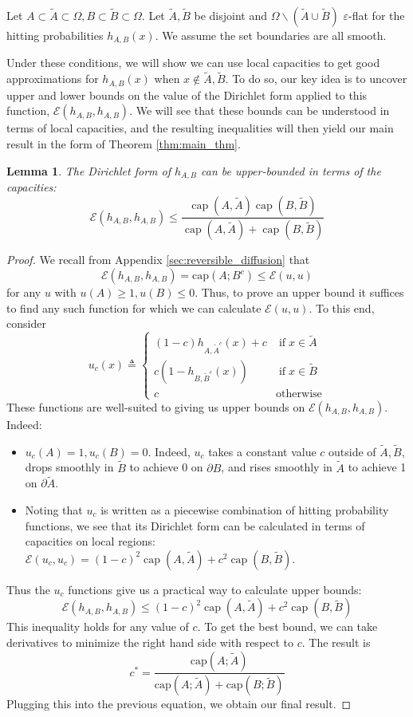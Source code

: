 \documentclass[english, aip, jcp, priprint, graphicx,floatfix]{revtex4-1}
\newcommand{\tmop}[1]{\ensuremath{\operatorname{#1}}}
\newtheorem{lemma}{Lemma}
\theoremstyle{plain}
\theoremstyle{definition}
\theoremstyle{plain}
\newcommand{\capac}[2]{\mathrm{cap}\left(#1;#2\right)}
\begin{document}
Let $A\subset\tilde A\subset\Omega,B\subset\tilde B\subset\Omega$.  Let $\tilde A,\tilde B$ be disjoint and $\Omega \backslash (\tilde A \cup \tilde B)$ $\varepsilon$-flat for the hitting probabilities $h_{A,B}(x)$.  We assume the set boundaries are all smooth.  

Under these conditions, we will show we can use local capacities to get good approximations for $h_{A,B}(x)$ when $x\notin \tilde A,\tilde B$.  To do so, our key idea is to uncover upper and lower bounds on the value of the Dirichlet form applied to this function, $\mathcal{E}(h_{A,B},h_{A,B})$.  We will see that these bounds can be understood in terms of local capacities, and the resulting inequalities will then yield our main result in the form of Theorem \ref{thm:main_thm}.

\begin{lemma}  The Dirichlet form of $h_{A,B}$ can be upper-bounded in terms of the capacities:
\[ \mathcal{E} (h_{A,B}, h_{A,B}) \leqslant \frac{\tmop{cap} (A, \tilde{A}) \tmop{cap} (B,
\tilde{B})}{\tmop{cap} (A, \tilde{A}) + \tmop{cap} (B, \tilde{B})} \]
\end{lemma}
\begin{proof}
We recall from Appendix \ref{sec:reversible_diffusion} that
%
\[
\mathcal{E} (h_{A,B}, h_{A,B}) = \capac{A}{B^c} \leq \mathcal{E} (u,u)
\]
%
for any $u$ with $u(A)\geq1,u(B)\leq0$.  Thus, to prove an upper bound it suffices to find any such function for which we can calculate $\mathcal{E}(u,u)$.  To this end, consider
%
\[
u_c (x) \triangleq \left\{ \begin{array}{ll}
(1 - c) h_{A, \widetilde{A}^c} (x) + c & \tmop{if} x \in \tilde{A}\\
c (1 - h_{B, \widetilde{B}^c} (x)) & \tmop{if} x \in \tilde{B}\\
c & \tmop{otherwise}
\end{array} \right. 
\]
%
These functions are well-suited to giving us upper bounds on $\mathcal{E} (h_{A,B}, h_{A,B})$.  Indeed:
\begin{itemize}
\item $u_c(A)=1,u_c(B)=0$.  Indeed, $u_c$ takes a constant value $c$ outside of $\tilde A,\tilde B$, drops smoothly in $\tilde B$ to achieve 0 on $\partial B$, and rises smoothly in $\tilde A$ to achieve 1 on $\partial \tilde A$.  
\item Noting that $u_c$ is written as a piecewise combination of hitting probability functions, we see that its Dirichlet form can be calculated in terms of capacities on local regions: $\mathcal{E}(u_c,u_c) = (1 - c)^2 \tmop{cap} (A, \tilde{A}) + c^2 \tmop{cap} (B, \tilde{B})$.
\end{itemize}
Thus the $u_c$ functions give us a practical way to calculate upper bounds: 
\[
\mathcal{E} (h_{A,B}, h_{A,B})\leq (1 - c)^2 \tmop{cap} (A, \tilde{A}) + c^2 \tmop{cap} (B, \tilde{B})
\]
This inequality holds for any value of $c$.  To get the best bound, we can take derivatives to minimize the right hand side with respect to $c$.  The result is 
\[
c^* = \frac{\capac{A}{\tilde A}}{\capac{A}{\tilde A}+\capac{B}{\tilde B}}
\]
Plugging this into the previous equation, we obtain our final result.
\end{proof}
\end{document}
